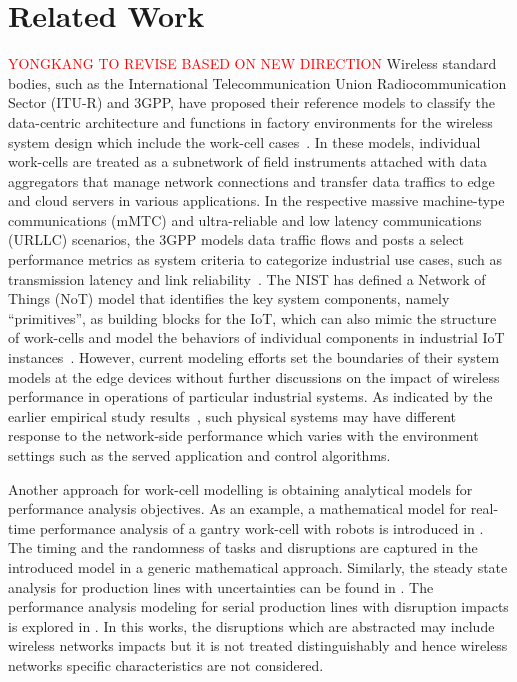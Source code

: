 	\section{Related Work}\label{sec:related-work}
	\textcolor{red}{YONGKANG TO REVISE BASED ON NEW DIRECTION}
	Wireless standard bodies, such as the International Telecommunication Union Radiocommunication Sector (ITU-R) and 3GPP, have proposed their reference models to classify the data-centric architecture and functions in factory environments for the wireless system design which include the work-cell cases~\cite{ETSI, KPItable}. In these models, individual work-cells are treated as a subnetwork of field instruments attached with data aggregators that manage network connections and transfer data traffics to edge and cloud servers in various applications. In the respective massive machine-type communications (mMTC) and ultra-reliable and low latency communications (URLLC) scenarios, the 3GPP models data traffic flows and posts a select performance metrics as system criteria to categorize industrial use cases, such as transmission latency and link reliability~\cite{KPItable}. The NIST has defined a Network of Things (NoT) model that identifies the key system components, namely ``primitives'', as building blocks for the IoT, which can also mimic the structure of work-cells and model the behaviors of individual components in industrial IoT instances~\cite{NIST800-183}. However, current modeling efforts set the boundaries of their system models at the edge devices without further discussions on the impact of wireless performance in operations of particular industrial systems. As indicated by the earlier empirical study results~\cite{LIU2017412}, such physical systems may have different response to the network-side performance which varies with the environment settings such as the served application and control algorithms. 
	
	Another approach for work-cell modelling is obtaining analytical models for performance analysis objectives. As an example, a mathematical model for real-time performance analysis of a gantry work-cell with robots is introduced in \cite{8098604,OU2017212}. The timing and the randomness of tasks and disruptions are captured in the introduced model in a generic mathematical approach. Similarly, the steady state analysis for production lines with uncertainties can be found in \cite{Colledani2013,doi:10.1080/00207543.2012.713137,doi:10.1080/00207540500385980}. The performance analysis modeling for serial production lines with disruption impacts is explored in \cite{QChang,Liu2012}. In this works, the disruptions which are abstracted may include wireless networks impacts but it is not treated distinguishably and hence wireless networks specific characteristics are not considered. 
	
